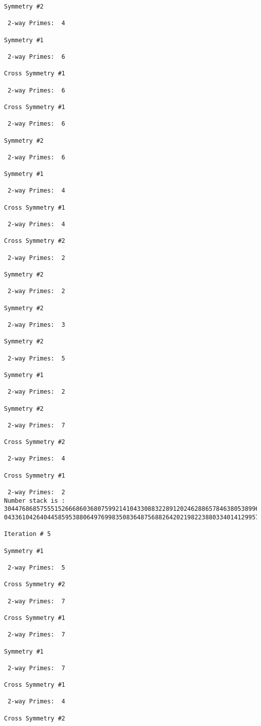 {{{{\begin{verbatim}
Symmetry #2

 2-way Primes: 	4

Symmetry #1

 2-way Primes: 	6

Cross Symmetry #1

 2-way Primes: 	6

Cross Symmetry #1

 2-way Primes: 	6

Symmetry #2

 2-way Primes: 	6

Symmetry #1

 2-way Primes: 	4

Cross Symmetry #1

 2-way Primes: 	4

Cross Symmetry #2

 2-way Primes: 	2

Symmetry #2

 2-way Primes: 	2

Symmetry #2

 2-way Primes: 	3

Symmetry #2

 2-way Primes: 	5

Symmetry #1

 2-way Primes: 	2

Symmetry #2

 2-way Primes: 	7

Cross Symmetry #2

 2-way Primes: 	4

Cross Symmetry #1

 2-way Primes: 	2
Number stack is :
30447686857555152666860368075992141043308832289120246288657846380538996794608835958544046240163340857
04336104264044585953880649769983508364875688264202198223880334014129957086306866625155575868674403758

Iteration #	5

Symmetry #1

 2-way Primes: 	5

Cross Symmetry #2

 2-way Primes: 	7

Cross Symmetry #1

 2-way Primes: 	7

Symmetry #1

 2-way Primes: 	7

Cross Symmetry #1

 2-way Primes: 	4

Cross Symmetry #2


\end{verbatim}}}}}
